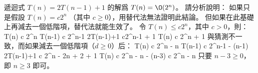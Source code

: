 \startEXERCISE
遞迴式 $T(n)=2T(n-1)+1$ 的解爲 $T(n)=\O(2^n)$。
請分析說明：
如果只是假設 $T(n)=c 2^n$ （其中 $c\ge 0$），用替代法無法證明此結論。
但如果在此基礎上再減去一個低階項，替代法就能生效了。
\stopEXERCISE
\startANSWER
令 $T(n)\le c 2^n$，其中 $c>0$，則：
\startformula\startmathalignment
\NC T(n) \NC \le c 2^n \NR
\NC T(n-1) \NC \le c 2^{n-1} \NR
\NC 2T(n-1)+1 \NC {} c2^{n-1} + 1 \NR
\NC T(n) \NC \le c 2^n + 1 \NR
\stopmathalignment\stopformula
與猜測不一致，而如果減去一個低階項（$d\ge 0$）后：
\startformula\startmathalignment
\NC T(n) \NC \le c 2^n - n \NR
\NC T(n-1) \NC \le c 2^{n-1} - (n-1) \NR
\NC 2T(n-1)+1 \NC \le c 2^n - 2n + 2 + 1 \NR
\NC T(n) \NC \le c 2^n - n - (n-3) \le c 2^n - n \NR
\stopmathalignment\stopformula
只要 $n-3\ge 0$，即 $n\ge 3$ 即可。
\stopANSWER

\stopsection
